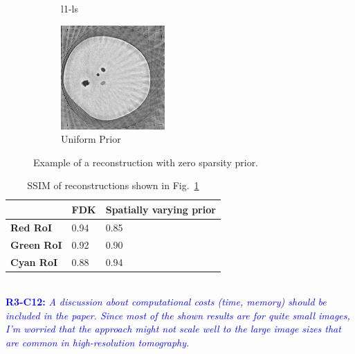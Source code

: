 \documentclass{article}
\begin{document}
\begin{figure}[!h]
\begin{subfigure}[b]{0.3\linewidth}
        \caption{l1-ls}
     \end{subfigure}
    \begin{subfigure}[b]{0.3\linewidth}
        \includegraphics[width=\textwidth]{../images/potato/cs_lambda_0/weightedPriorIm_green.png}
        \caption{Uniform Prior}
     \end{subfigure}
     \caption{Example of a reconstruction with zero sparsity prior.}
     \label{fig:potato_cs_lambda_0}
\end{figure}
\begin{table}[!h]
  \centering
  \caption{SSIM of reconstructions shown in Fig.~\ref{fig:potato_cs_lambda_0}}
\begin{tabular}{|l|l|l|}
\hline
 & \textbf{FDK} & \textbf{Spatially varying prior} \\ \hline
\textbf{Red RoI} & 0.94 & 0.85 \\ \hline
\textbf{Green RoI} & 0.92 & 0.90 \\ \hline
\textbf{Cyan RoI} & 0.88 & 0.94 \\ \hline
\end{tabular}
\end{table}\\

\textcolor{blue}{\textbf{R3-C12:}\textit{ A discussion about computational costs (time, memory) should be included in the paper. Since most of the shown results are for quite small images, I'm worried that the approach might not scale well to the large image sizes that are common in high-resolution tomography.   }}
\end{document}
